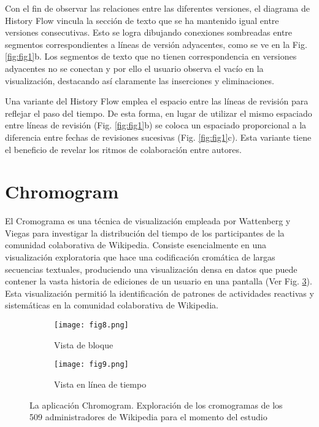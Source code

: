 Con el fin de observar las relaciones entre las diferentes versiones, el diagrama de History Flow vincula la sección de texto que se ha mantenido igual entre versiones consecutivas. Esto se logra dibujando conexiones sombreadas entre segmentos correspondientes a líneas de versión adyacentes, como se ve en la Fig. \ref{fig:fig1}b. Los segmentos de texto que no tienen correspondencia en versiones adyacentes no se conectan y por ello el usuario observa el vacío en la visualización, destacando así claramente las inserciones y eliminaciones.

Una variante del History Flow emplea el espacio entre las líneas de revisión para reflejar el paso del tiempo. De esta forma, en lugar de utilizar el mismo espaciado entre líneas de revisión (Fig. \ref{fig:fig1}b) se coloca un espaciado proporcional a la diferencia entre fechas de revisiones sucesivas (Fig. \ref{fig:fig1}c). Esta variante tiene el beneficio de revelar los ritmos de colaboración entre autores.

\section{Chromogram}
El Cromograma es una técnica de visualización empleada por Wattenberg y Viegas \cite{Wat07} para investigar la distribución del tiempo de los participantes de la comunidad colaborativa de Wikipedia. Consiste esencialmente en una visualización exploratoria que hace una codificación cromática de largas secuencias textuales, produciendo una visualización densa en datos que puede contener la vasta historia de ediciones de un usuario en una pantalla (Ver Fig. \ref{fig:fig8-9}). Esta visualización permitió la identificación de patrones de actividades reactivas y sistemáticas en la comunidad colaborativa de Wikipedia.

\begin{figure}[htp]
  \begin{subfigure}[b]{0.5\textwidth}
    \centering
    \texttt{[image: fig8.png]}
    \caption{Vista de bloque\cite[Fig. 3]{Wat07}}
    \label{fig:fig8}
  \end{subfigure}
  \hfill
  \begin{subfigure}[b]{0.45\textwidth}
    \centering
    \texttt{[image: fig9.png]}
    \caption{Vista en línea de tiempo\cite[Fig. 4]{Wat07}}
    \label{fig:fig9}
  \end{subfigure}
  \caption{La aplicación Chromogram. Exploración de los cromogramas de los 509 administradores de Wikipedia para el momento del estudio}
  \label{fig:fig8-9}
\end{figure}

